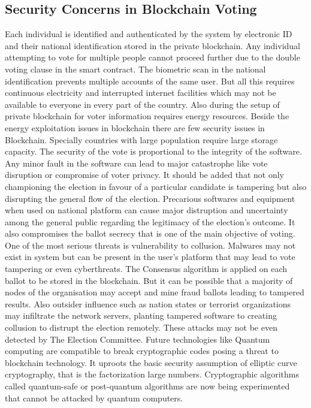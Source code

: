 \documentclass{article}
\begin{document}
\subsection{Security Concerns in Blockchain Voting}
Each individual is identiﬁed and authenticated by the system by electronic ID and their national identification stored in the private blockchain. Any individual attempting to vote for multiple people cannot proceed further due to the double voting clause in the smart contract. The biometric scan in the national identification prevents multiple accounts of the same user. 
But all this requires continuous electricity and interrupted internet facilities which may not be available to everyone in every part of the country.  Also during the setup of private blockchain for voter information requires energy resources.
Beside the energy exploitation issues in blockchain there are few security issues in Blockchain. Specially countries with large population require large storage capacity. The security of the vote is proportional to the integrity of the software. Any minor fault in the software can lead to major catastrophe like vote disruption or compromise of voter privacy. It should be added that not only championing the election in favour of a particular candidate is tampering but also disrupting the general flow of the election. Precarious softwares and equipment when used on national platform can cause major distruption and uncertainty among the general public regarding the legitimacy of the election's outcome. It also compromises the ballot secrecy that is one of the main objective of voting. One of the most serious threats is vulnerability to collusion. Malwares may not exist in system but can be present in the user's platform that may lead to vote tampering or even cyberthreats.
The Consensus algorithm is applied on each ballot to be stored in the blockchain. But it can be possible that a majority of nodes of the organisation may accept and mine fraud ballots leading to tampered results. Also outsider influence such as nation states or terrorist organizations may infiltrate the network servers, planting tampered software to creating collusion to distrupt the election remotely. These attacks may not be even detected by The Election Committee.
Future technologies like Quantum computing are compatible to break cryptographic codes posing a threat to blockchain technology. It uproots the basic security assumption of elliptic curve cryptography, that is the factorization large numbers. Cryptographic algorithms called quantum-safe or post-quantum algorithms are now being experimented that cannot be attacked by quantum computers. 
\end{document}
